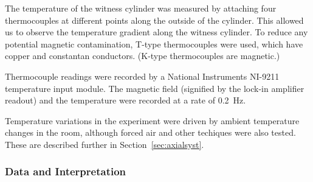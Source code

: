 

%


The temperature of the witness cylinder was measured by attaching four
thermocouples at different points along the outside of the cylinder.
This allowed us to observe the temperature gradient along the witness
cylinder.  To reduce any potential magnetic contamination, T-type
thermocouples were used, which have copper and constantan conductors.
(K-type thermocouples are magnetic.)

Thermocouple readings were recorded by a National Instruments NI-9211
temperature input module.  The magnetic field (signified by the
lock-in amplifier readout) and the temperature were recorded at a rate
of 0.2~Hz.

Temperature variations in the experiment were driven by ambient
temperature changes in the room, although forced air and other
techiques were also tested.  These are described further in
Section~\ref{sec:axialsyst}.


\subsubsection{Data and Interpretation\label{sec:axialsyst}}

